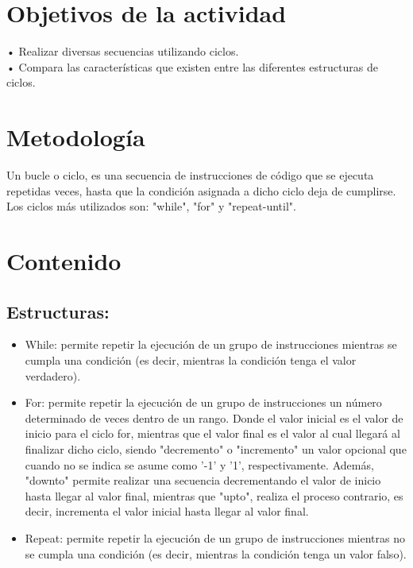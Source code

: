 \documentclass[conference]{IEEEtran}
\begin{document}
\section{Objetivos de la actividad}
\begin{center}
• Realizar diversas secuencias utilizando ciclos.\\
• Compara las características que existen entre las diferentes estructuras de ciclos.
\end{center}

\section{Metodología}
Un bucle o ciclo, es una secuencia de instrucciones de código que se ejecuta repetidas veces, hasta que la condición asignada a dicho ciclo deja de cumplirse. Los ciclos más utilizados son: "while", "for" y "repeat-until". 

\section{Contenido}
\subsection{Estructuras:}
\begin{itemize}
\item While: permite repetir la ejecución de un grupo de instrucciones mientras se cumpla una condición (es decir, mientras la condición tenga el valor verdadero).
\item For: permite repetir la ejecución de un grupo de instrucciones un número determinado de veces dentro de un rango. Donde el valor inicial es el valor de inicio para el ciclo for, mientras que el valor final es el valor al cual llegará al finalizar dicho ciclo, siendo "decremento" o "incremento" un valor opcional que cuando no se indica se asume como '-1' y '1', respectivamente. Además, "downto" permite realizar una secuencia decrementando el valor de inicio hasta llegar al valor final, mientras que "upto", realiza el proceso contrario, es decir, incrementa el valor inicial hasta llegar al valor final.
\item Repeat: permite repetir la ejecución de un grupo de instrucciones mientras no se cumpla una condición (es decir, mientras la condición tenga un valor falso).
\end{itemize}
\end{document}
